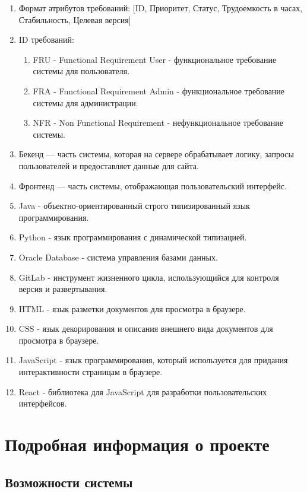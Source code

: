 \documentclass{article}
\begin{document}
\begin{enumerate}
    \item Формат атрибутов требований: [ID, Приоритет, Статус, Трудоемкость в часах, Стабильность, Целевая версия]
    \item ID требований:
    \begin{enumerate}
        \item FRU - Functional Requirement User - функциональное требование системы для пользователя.
        \item FRA - Functional Requirement Admin - функциональное требование системы для администрации.
        \item NFR - Non Functional Requirement - нефункциональное требование системы.
    \end{enumerate}
    \item Бекенд — часть системы, которая на сервере обрабатывает логику, запросы пользователей и предоставляет данные для сайта.
    \item Фронтенд — часть системы, отображающая пользовательский интерфейс.
    \item Java - объектно-ориентированный строго типизированный язык программирования. 
    \item Python - язык программирования с динамической типизацией.
    \item Oracle Database - система управления базами данных.
    \item GitLab - инструмент жизненного цикла, использующийся для контроля версия и развертывания.
    \item HTML - язык разметки документов для просмотра в браузере.
    \item CSS - язык декорирования и описания внешнего вида документов для просмотра в браузере.
    \item JavaScript - язык программирования, который используется для придания интерактивности страницам в браузере.
    \item React - библиотека для JavaScript для разработки пользовательских интерфейсов.
    
\end{enumerate}

\section{Подробная информация о проекте}

\subsection{Возможности системы}
\end{document}
